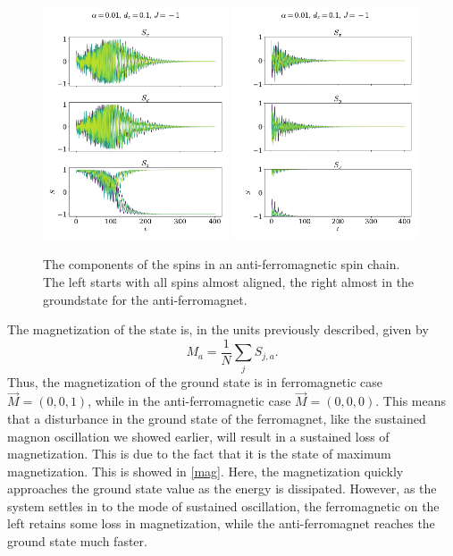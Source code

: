 \documentclass{article}
\begin{document}
    \begin{figure}[H]
        \centering
        \includegraphics[width=0.49\textwidth]{../plots/2225.pdf}
        \includegraphics[width=0.49\textwidth]{../plots/22252.pdf}
        \caption{The components of the spins in an anti-ferromagnetic spin chain. The left starts with all spins almost aligned, the right almost in the groundstate for the anti-ferromagnet.}
        \label{one tilted dampend af}
    \end{figure}


    The magnetization of the state is, in the units previously described, given by
    \begin{equation*}
        M_a = \frac{1}{N} \sum_j S_{j, a}.
    \end{equation*}
    Thus, the magnetization of the ground state is in ferromagnetic case $\vec M = (0, 0, 1)$, while in the anti-ferromagnetic case $\vec M = (0, 0, 0)$.
    This means that a disturbance in the ground state of the ferromagnet, like the sustained magnon oscillation we showed earlier, will result in a sustained loss of magnetization.
    This is due to the fact that it is the state of maximum magnetization.
    This is showed in \autoref{mag}.
    Here, the magnetization quickly approaches the ground state value as the energy is dissipated.
    However, as the system settles in to the mode of sustained oscillation, the ferromagnetic on the left retains some loss in magnetization, while the anti-ferromagnet reaches the ground state much faster.
\end{document}
